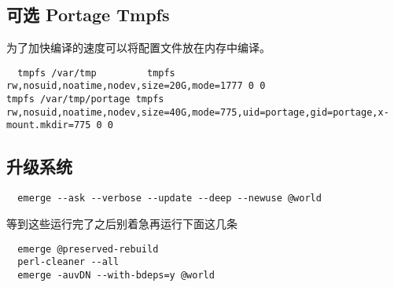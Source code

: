 \subsection{可选 Portage Tmpfs}
为了加快编译的速度可以将配置文件放在内存中编译。
\begin{lstlisting}
  tmpfs /var/tmp         tmpfs rw,nosuid,noatime,nodev,size=20G,mode=1777 0 0
tmpfs /var/tmp/portage tmpfs rw,nosuid,noatime,nodev,size=40G,mode=775,uid=portage,gid=portage,x-mount.mkdir=775 0 0
\end{lstlisting}


\subsection{升级系统}
\begin{lstlisting}
  emerge --ask --verbose --update --deep --newuse @world
\end{lstlisting}

等到这些运行完了之后别着急再运行下面这几条
\begin{lstlisting}
  emerge @preserved-rebuild
  perl-cleaner --all
  emerge -auvDN --with-bdeps=y @world
\end{lstlisting}
